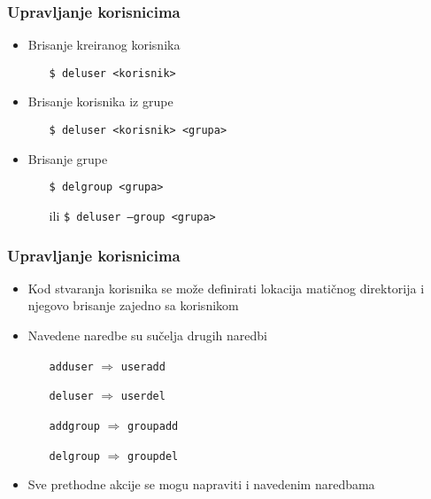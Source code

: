 \documentclass[table,usenames,dvipsnames] {beamer}
\newcommand{\shell}[1]{\texttt{#1}}
\begin{document}
\begin{frame}[t]
\frametitle{Upravljanje korisnicima}
\begin{itemize}
  \item Brisanje kreiranog korisnika
  \begin{itemize}
    \item[] \shell{\$ deluser <korisnik>}
  \end{itemize}
  \item Brisanje korisnika iz grupe
  \begin{itemize}
    \item[] \shell{\$ deluser <korisnik> <grupa>}
  \end{itemize}
  \item Brisanje grupe
  \begin{itemize}
  	\item[] \shell{\$ delgroup <grupa>}
    \item[ili] \shell{\$ deluser --group <grupa>}
  \end{itemize}
\end{itemize}
\end{frame}

\begin{frame}[t]
\frametitle{Upravljanje korisnicima}
\begin{itemize}
  \item Kod stvaranja korisnika se može definirati lokacija matičnog 
        direktorija i njegovo brisanje zajedno sa korisnikom
  \item Navedene naredbe su sučelja drugih naredbi
  \begin{itemize}
    \item[] \shell{adduser} $\Rightarrow$ \shell{useradd}
    \item[] \shell{deluser} $\Rightarrow$ \shell{userdel}
    \item[] \shell{addgroup} $\Rightarrow$ \shell{groupadd}
    \item[] \shell{delgroup} $\Rightarrow$ \shell{groupdel}
  \end{itemize}
  \item Sve prethodne akcije se mogu napraviti i navedenim naredbama
\end{itemize}
\end{frame}
\end{document}
